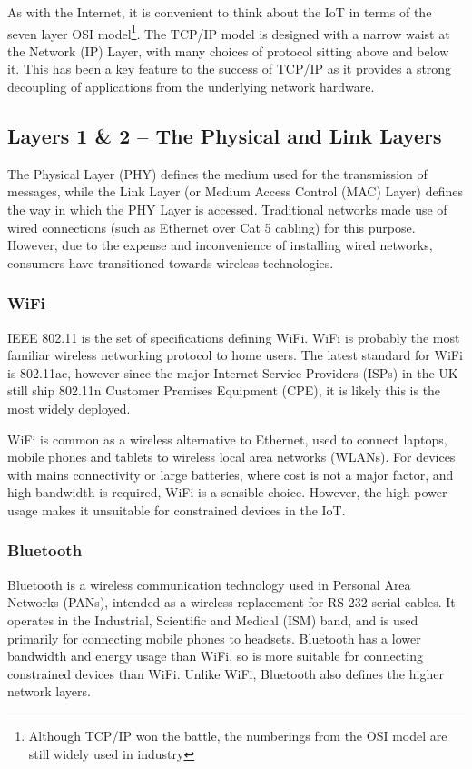\documentclass[10pt,journal,compsoc]{IEEEtran}
\begin{document}
As with the Internet, it is convenient to think about the IoT in terms of the
seven layer OSI model\footnote{Although TCP/IP won the battle, the numberings
from the OSI model are still widely used in industry}. The TCP/IP model is
designed with a narrow waist at the Network (IP) Layer, with many choices of
protocol sitting above and below it. This has been a key feature to the success
of TCP/IP as it provides a strong decoupling of applications from the
underlying network hardware.

\subsection{Layers 1 \& 2 -- The Physical and Link Layers}
\label{layer_1_2}
The Physical Layer (PHY) defines the medium used for the transmission of
messages, while the Link Layer (or Medium Access Control (MAC) Layer) defines
the way in which the PHY Layer is accessed. Traditional networks made use of
wired connections (such as Ethernet over Cat 5 cabling) for this purpose.
However, due to the expense and inconvenience of installing wired networks,
consumers have transitioned towards wireless technologies. 

\subsubsection{WiFi}
IEEE 802.11 is the set of specifications defining WiFi. WiFi is probably the
most familiar wireless networking protocol to home users. The latest standard
for WiFi is 802.11ac, however since the major Internet Service Providers (ISPs) in
the UK still ship 802.11n Customer Premises Equipment (CPE), it is
likely this is the most widely deployed.

WiFi is common as a wireless alternative to Ethernet, used to connect laptops,
mobile phones and tablets to wireless local area networks (WLANs). For devices
with mains connectivity or large batteries, where cost is not a major factor,
and high bandwidth is required, WiFi is a sensible choice. However, the high
power usage makes it unsuitable for constrained devices in the IoT.

\subsubsection{Bluetooth}
Bluetooth is a wireless communication technology used in Personal Area Networks
(PANs), intended as a wireless replacement for RS-232 serial cables. It
operates in the Industrial, Scientific and Medical (ISM) band, and is used
primarily for connecting mobile phones to headsets. Bluetooth has a lower
bandwidth and energy usage than WiFi, so is more suitable for connecting
constrained devices than WiFi. Unlike WiFi, Bluetooth also defines the higher
network layers. 
\end{document}
